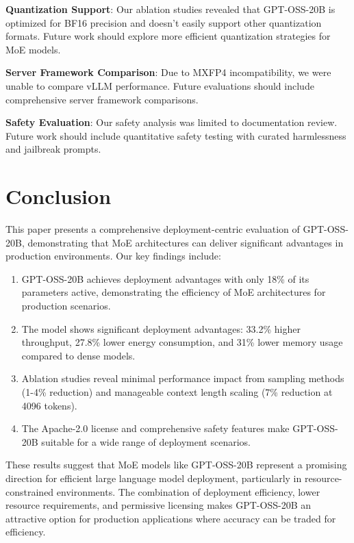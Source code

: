 \documentclass[11pt]{article}
\begin{document}
\textbf{Quantization Support}: Our ablation studies revealed that GPT-OSS-20B is optimized for BF16 precision and doesn't easily support other quantization formats. Future work should explore more efficient quantization strategies for MoE models.

\textbf{Server Framework Comparison}: Due to MXFP4 incompatibility, we were unable to compare vLLM performance. Future evaluations should include comprehensive server framework comparisons.

\textbf{Safety Evaluation}: Our safety analysis was limited to documentation review. Future work should include quantitative safety testing with curated harmlessness and jailbreak prompts.

\section{Conclusion}

This paper presents a comprehensive deployment-centric evaluation of GPT-OSS-20B, demonstrating that MoE architectures can deliver significant advantages in production environments. Our key findings include:

\begin{enumerate}
    \item GPT-OSS-20B achieves deployment advantages with only 18\% of its parameters active, demonstrating the efficiency of MoE architectures for production scenarios.
    
    \item The model shows significant deployment advantages: 33.2\% higher throughput, 27.8\% lower energy consumption, and 31\% lower memory usage compared to dense models.
    
    \item Ablation studies reveal minimal performance impact from sampling methods (1-4\% reduction) and manageable context length scaling (7\% reduction at 4096 tokens).
    
    \item The Apache-2.0 license and comprehensive safety features make GPT-OSS-20B suitable for a wide range of deployment scenarios.
\end{enumerate}

These results suggest that MoE models like GPT-OSS-20B represent a promising direction for efficient large language model deployment, particularly in resource-constrained environments. The combination of deployment efficiency, lower resource requirements, and permissive licensing makes GPT-OSS-20B an attractive option for production applications where accuracy can be traded for efficiency.
\end{document}
